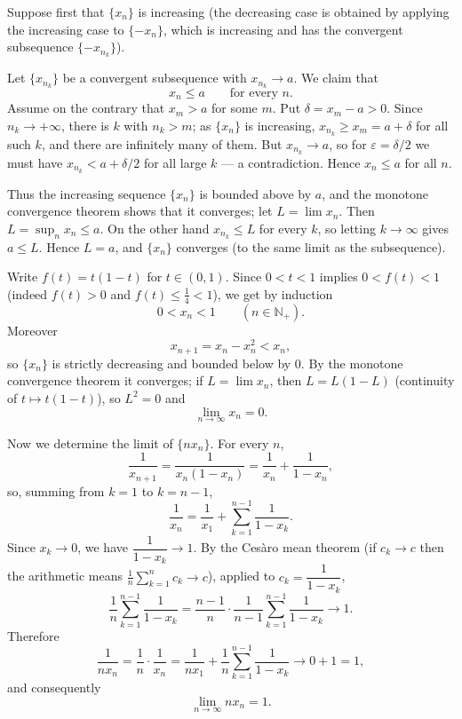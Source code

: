 \documentclass[11pt,a4paper]{article}
\newenvironment{solution}[1]{%
  \par\addvspace{1.7ex}%
  \noindent{\color{solutioncolor}\textbf{#1}}\hspace{0.55em}\ignorespaces}%
  {\par\addvspace{0.9ex}}
\begin{document}
\begin{solution}{Solution 2.3.4}\label{xs:2.3.4}
Suppose first that $\{x_n\}$ is increasing (the decreasing case is obtained by applying the increasing case to $\{-x_n\}$, which is increasing and has the convergent subsequence $\{-x_{n_k}\}$).

Let $\{x_{n_k}\}$ be a convergent subsequence with $x_{n_k}\to a$. We claim that
\[
x_n\le a\qquad\text{for every } n .
\]
Assume on the contrary that $x_m>a$ for some $m$. Put $\delta=x_m-a>0$. Since $n_k\to+\infty$, there is $k$ with $n_k>m$; as $\{x_n\}$ is increasing, $x_{n_k}\ge x_m=a+\delta$ for all such $k$, and there are infinitely many of them. But $x_{n_k}\to a$, so for $\varepsilon=\delta/2$ we must have $x_{n_k}<a+\delta/2$ for all large $k$ --- a contradiction. Hence $x_n\le a$ for all $n$.

Thus the increasing sequence $\{x_n\}$ is bounded above by $a$, and the monotone convergence theorem shows that it converges; let $L=\lim x_n$. Then $L=\sup_n x_n\le a$. On the other hand $x_{n_k}\le L$ for every $k$, so letting $k\to\infty$ gives $a\le L$. Hence $L=a$, and $\{x_n\}$ converges (to the same limit as the subsequence).
\end{solution}

\begin{solution}{Solution 2.3.5}\label{xs:2.3.5}
Write $f(t)=t(1-t)$ for $t\in(0,1)$. Since $0<t<1$ implies $0<f(t)<1$ (indeed $f(t)>0$ and $f(t)\le\frac14<1$), we get by induction
\[
0<x_n<1\qquad(n\in\mathbb N_+).
\]
Moreover
\[
x_{n+1}=x_n-x_n^2<x_n ,
\]
so $\{x_n\}$ is strictly decreasing and bounded below by $0$. By the monotone convergence theorem it converges; if $L=\lim x_n$, then $L=L(1-L)$ (continuity of $t\mapsto t(1-t)$), so $L^2=0$ and
\[
\lim_{n\to\infty}x_n=0 .
\]

Now we determine the limit of $\{nx_n\}$. For every $n$,
\[
\frac{1}{x_{n+1}}=\frac{1}{x_n(1-x_n)}=\frac{1}{x_n}+\frac{1}{1-x_n},
\]
so, summing from $k=1$ to $k=n-1$,
\[
\frac{1}{x_n}=\frac{1}{x_1}+\sum_{k=1}^{n-1}\frac{1}{1-x_k}.
\]
Since $x_k\to0$, we have $\dfrac{1}{1-x_k}\to1$. By the Ces\`aro mean theorem (if $c_k\to c$ then the arithmetic means $\frac{1}{n}\sum_{k=1}^{n}c_k\to c$), applied to $c_k=\dfrac{1}{1-x_k}$,
\[
\frac{1}{n}\sum_{k=1}^{n-1}\frac{1}{1-x_k}=\frac{n-1}{n}\cdot\frac{1}{n-1}\sum_{k=1}^{n-1}\frac{1}{1-x_k}\longrightarrow 1 .
\]
Therefore
\[
\frac{1}{nx_n}=\frac{1}{n}\cdot\frac{1}{x_n}=\frac{1}{nx_1}+\frac{1}{n}\sum_{k=1}^{n-1}\frac{1}{1-x_k}\longrightarrow 0+1=1,
\]
and consequently
\[
\lim_{n\to\infty}nx_n=1 .
\]
\end{solution}
\end{document}
